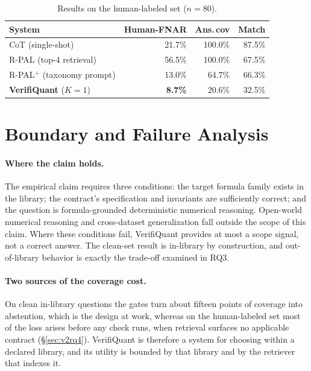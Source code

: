\documentclass[sigconf]{acmart}
\begin{document}
\begin{table}[t]
\caption{Results on the human-labeled set ($n{=}80$).}
\label{tab:v2ext}
\small
\begin{tabular}{@{}lrrr@{}}
\toprule
System & Human-FNAR & Ans.\,cov & Match \\
\midrule
CoT (single-shot) & 21.7\% & 100.0\% & 87.5\% \\
R-PAL (top-4 retrieval) & 56.5\% & 100.0\% & 67.5\% \\
R-PAL$^{+}$ (taxonomy prompt) & 13.0\% & 64.7\% & 66.3\% \\
\textbf{VerifiQuant} ($K{=}1$) & \textbf{8.7\%} & 20.6\% & 32.5\% \\
\bottomrule
\end{tabular}
\end{table}

\section{Boundary and Failure Analysis}\label{sec:v2boundary}
\paragraph{Where the claim holds.}
The empirical claim requires three conditions: the target formula family exists in the library; the contract's specification and invariants are sufficiently correct; and the question is formula-grounded deterministic numerical reasoning.
Open-world numerical reasoning and cross-dataset generalization fall outside the scope of this claim.
Where these conditions fail, VerifiQuant provides at most a scope signal, not a correct answer.
The clean-set result is in-library by construction, and out-of-library behavior is exactly the trade-off examined in RQ3.

\paragraph{Two sources of the coverage cost.}
On clean in-library questions the gates turn about fifteen points of coverage into abstention, which is the design at work, whereas on the human-labeled set most of the loss arises before any check runs, when retrieval surfaces no applicable contract (\S\ref{sec:v2rq4}). VerifiQuant is therefore a system for choosing within a declared library, and its utility is bounded by that library and by the retriever that indexes it.
\end{document}
